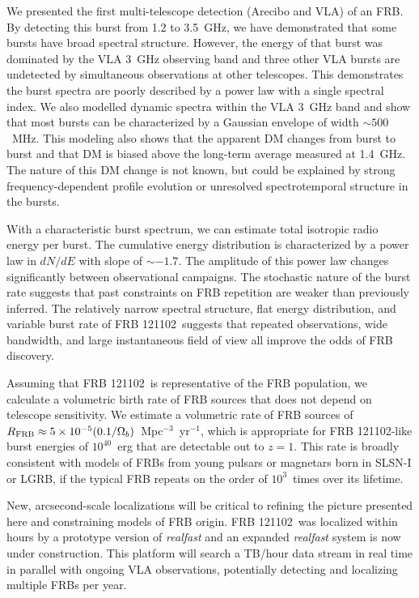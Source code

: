 \documentclass[twocolumn]{aastex61}
\newcommand{\frb}{FRB 121102}
\begin{document}
We presented the first multi-telescope detection (Arecibo and VLA) of an FRB. By detecting this burst from 1.2 to 3.5~GHz, we have demonstrated that some bursts have broad spectral structure. However, the energy of that burst was dominated by the VLA 3~GHz observing band and three other VLA bursts are undetected by simultaneous observations at other telescopes. This demonstrates the burst spectra are poorly described by a power law with a single spectral index. We also modelled dynamic spectra within the VLA 3~GHz band and show that most bursts can be characterized by a Gaussian envelope of width $\sim500$\ MHz. This modeling also shows that the apparent DM changes from burst to burst and that DM is biased above the long-term average measured at 1.4~GHz. The nature of this DM change is not known, but could be explained by strong frequency-dependent profile evolution or unresolved spectrotemporal structure in the bursts.

With a characteristic burst spectrum, we can estimate total isotropic radio energy per burst. The cumulative energy distribution is characterized by a power law in $dN/dE$ with slope of $\sim-1.7$. The amplitude of this power law changes significantly between observational campaigns. The stochastic nature of the burst rate suggests that past constraints on FRB repetition are weaker than previously inferred. The relatively narrow spectral structure, flat energy distribution, and variable burst rate of \frb\ suggests that repeated observations, wide bandwidth, and large instantaneous field of view all improve the odds of FRB discovery.

Assuming that \frb\ is representative of the FRB population, we calculate a volumetric birth rate of FRB sources that does not depend on telescope sensitivity. We estimate a volumetric rate of FRB sources of $R_{\rm{FRB}} \approx 5\times10^{-5} (0.1/\Omega_b)$\ Mpc$^{-3}$\ yr$^{-1}$, which is appropriate for \frb-like burst energies of $10^{40}$\ erg that are detectable out to $z=1$. This rate is broadly consistent with models of FRBs from young pulsars or magnetars born in SLSN-I or LGRB, if the typical FRB repeats on the order of $10^3$\ times over its lifetime.

New, arcsecond-scale localizations will be critical to refining the picture presented here and constraining models of FRB origin. \frb\ was localized within hours by a prototype version of \textit{realfast} and an expanded \textit{realfast} system is now under construction. This platform will search a TB/hour data stream in real time in parallel with ongoing VLA observations, potentially detecting and localizing multiple FRBs per year.
\end{document}
